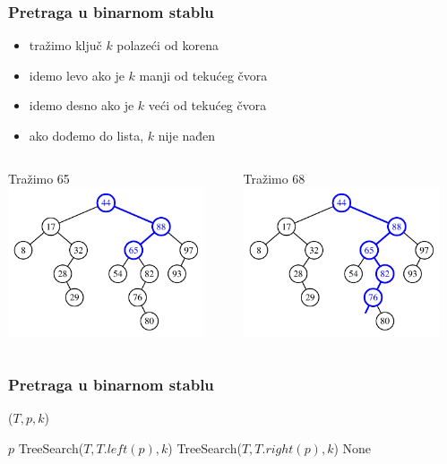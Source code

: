 \documentclass[compress,aspectratio=169]{beamer}
\renewcommand{\algorithmiccomment}[1]{\hfill \{\myred{#1}\}}
\begin{document}
\begin{frame}[fragile]
  \frametitle{Pretraga u binarnom stablu}
  \begin{itemize}
    \item tražimo ključ $k$ polazeći od korena
    \item idemo levo ako je $k$ manji od tekućeg čvora
    \item idemo desno ako je $k$ veći od tekućeg čvora
    \item ako dođemo do lista, $k$ nije nađen
  \end{itemize}
  \begin{columns}
    \begin{column}[c]{6cm}
      \begin{center}
        Tražimo 65
        \includegraphics[width=5.8cm]{asp-11-pic03a.pdf}
      \end{center}
    \end{column}  
    \begin{column}[c]{6cm}
      \begin{center}
        Tražimo 68
        \includegraphics[width=5.8cm]{asp-11-pic03b.pdf}
      \end{center}
    \end{column}  
  \end{columns}
\end{frame}

\renewcommand{\algorithmiccomment}[1]{\hfill \{\myred{#1}\}}

\begin{frame}[fragile]
  \frametitle{Pretraga u binarnom stablu}
($T, p, k$)
\begin{algorithmic}
  \RETURN $p$ 
  \RETURN TreeSearch($T, T.left(p), k$) 
  \RETURN TreeSearch($T, T.right(p), k$) 
\ENDIF
\RETURN None  
\end{algorithmic}
\end{frame}
\end{document}
